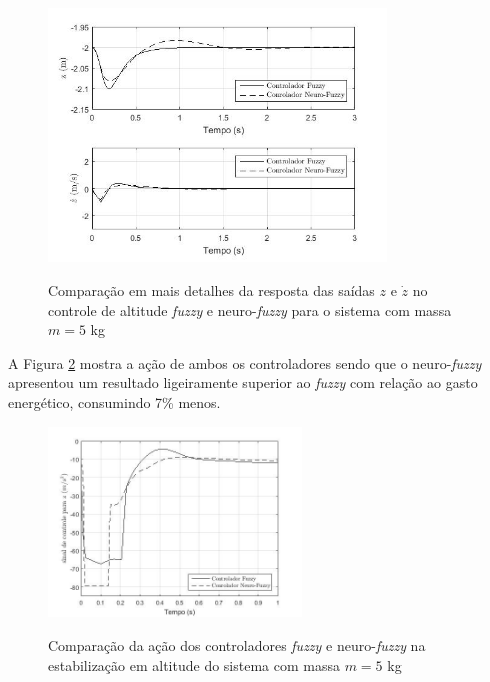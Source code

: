 \begin{figure}[!htb]
    \centering
    \caption{Comparação em mais detalhes da resposta das saídas $z$ e $\dot{z}$ no controle de altitude \textit{fuzzy} e neuro-\textit{fuzzy} para o sistema com massa $m=5$ kg}
    \includegraphics[width=0.8\textwidth]{./04-figuras/figuras_pos_banca/6-altitude5kg/graph_z_zdot_5kg_details}
    \label{fig:altitude_z_zdot_5kg_closer}
\end{figure}

A Figura \ref{fig:graph_control_z5kg} mostra a ação de ambos os controladores sendo que o neuro-\textit{fuzzy} apresentou um resultado ligeiramente superior ao \textit{fuzzy} com relação ao gasto energético, consumindo 7\% menos.

\begin{figure}[!htb]
    \centering
    \caption{Comparação da ação dos controladores \textit{fuzzy} e neuro-\textit{fuzzy} na estabilização em altitude do sistema com massa $m=5$ kg}
    \includegraphics[width=0.6\textwidth]{./04-figuras/figuras_pos_banca/6-altitude5kg/grap_control_z}
    \label{fig:graph_control_z5kg}
\end{figure}


